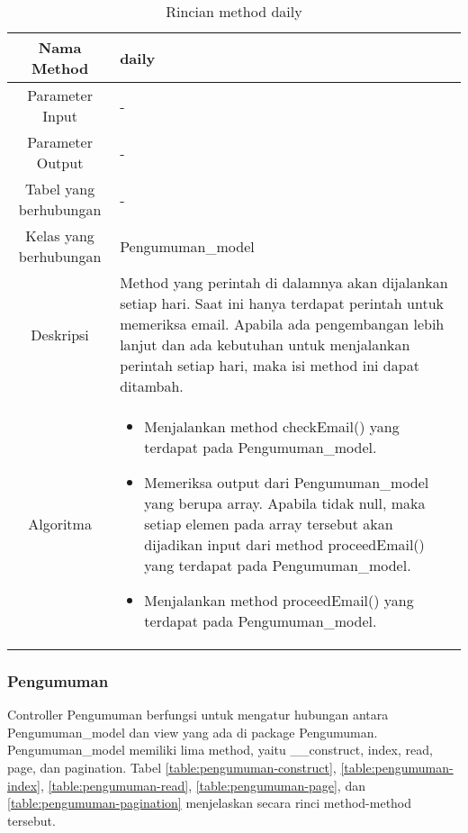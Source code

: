 \begin{center}
	\begin{table}[H]
	\caption{Rincian method daily}
	\label{table:cron-daily}
\begin{tabular}{|c|p{11cm}|}
\hline
Nama Method 	& 	daily 	\\
\hline
Parameter Input & - \\
\hline
Parameter Output & - \\
\hline
Tabel yang berhubungan & - \\
\hline
Kelas yang berhubungan & Pengumuman\_model \\
\hline
Deskripsi	& Method yang perintah di dalamnya akan dijalankan setiap hari. Saat ini hanya terdapat perintah untuk memeriksa email. Apabila ada pengembangan lebih lanjut dan ada kebutuhan untuk menjalankan perintah setiap hari, maka isi method ini dapat ditambah.\\
\hline
Algoritma	& \begin{itemize}
				\item Menjalankan method checkEmail() yang terdapat pada Pengumuman\_model.
				\item Memeriksa output dari Pengumuman\_model yang berupa array. Apabila tidak null, maka setiap elemen pada array tersebut akan dijadikan input dari method proceedEmail() yang terdapat pada Pengumuman\_model.
				\item Menjalankan method proceedEmail() yang terdapat pada Pengumuman\_model.
				\end{itemize} \\
\hline
\end{tabular}
\end{table}
\end{center}

\subsubsection{Pengumuman}
Controller Pengumuman berfungsi untuk mengatur hubungan antara Pengumuman\_model dan view yang ada di package Pengumuman. Pengumuman\_model memiliki lima method, yaitu \_\_construct, index, read, page, dan pagination. Tabel \ref{table:pengumuman-construct}, \ref{table:pengumuman-index}, \ref{table:pengumuman-read}, \ref{table:pengumuman-page}, dan \ref{table:pengumuman-pagination} menjelaskan secara rinci method-method tersebut.

